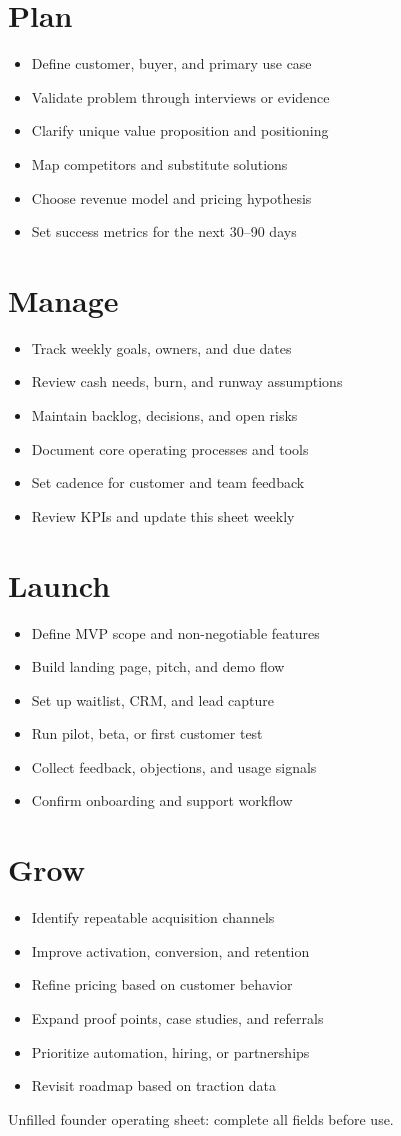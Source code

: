 \documentclass[10pt]{article}
\newcommand{\checkitem}[1]{\item[$\square$] #1}
\begin{document}
\begin{minipage}[t]{0.49\textwidth}
\section*{Plan}
\begin{itemize}
    \checkitem{Define customer, buyer, and primary use case}
    \checkitem{Validate problem through interviews or evidence}
    \checkitem{Clarify unique value proposition and positioning}
    \checkitem{Map competitors and substitute solutions}
    \checkitem{Choose revenue model and pricing hypothesis}
    \checkitem{Set success metrics for the next 30--90 days}
\end{itemize}

\section*{Manage}
\begin{itemize}
    \checkitem{Track weekly goals, owners, and due dates}
    \checkitem{Review cash needs, burn, and runway assumptions}
    \checkitem{Maintain backlog, decisions, and open risks}
    \checkitem{Document core operating processes and tools}
    \checkitem{Set cadence for customer and team feedback}
    \checkitem{Review KPIs and update this sheet weekly}
\end{itemize}
\end{minipage}\hfill
\begin{minipage}[t]{0.49\textwidth}
\section*{Launch}
\begin{itemize}
    \checkitem{Define MVP scope and non-negotiable features}
    \checkitem{Build landing page, pitch, and demo flow}
    \checkitem{Set up waitlist, CRM, and lead capture}
    \checkitem{Run pilot, beta, or first customer test}
    \checkitem{Collect feedback, objections, and usage signals}
    \checkitem{Confirm onboarding and support workflow}
\end{itemize}

\section*{Grow}
\begin{itemize}
    \checkitem{Identify repeatable acquisition channels}
    \checkitem{Improve activation, conversion, and retention}
    \checkitem{Refine pricing based on customer behavior}
    \checkitem{Expand proof points, case studies, and referrals}
    \checkitem{Prioritize automation, hiring, or partnerships}
    \checkitem{Revisit roadmap based on traction data}
\end{itemize}
\end{minipage}

\vfill
{\footnotesize Unfilled founder operating sheet: complete all fields before use.}
\end{document}
